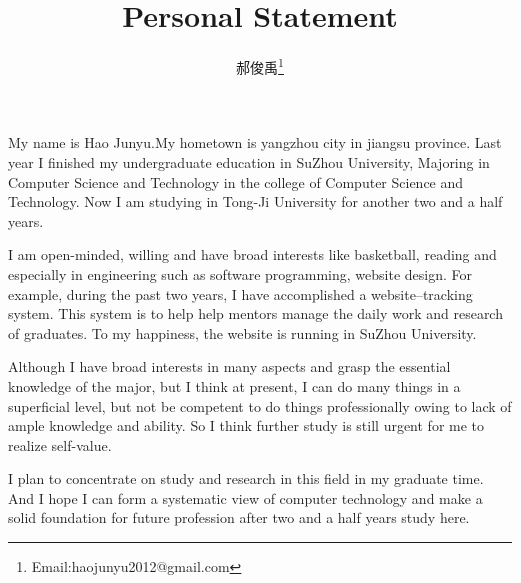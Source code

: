 \documentclass[10pt,a4paper]{article}
\begin{document}
\begin{CJK*}{UTF8}{gkai}
\pagestyle{fancy} 
\lhead{}
\rhead{}
\title{Personal Statement}					   		%
\author{郝俊禹\thanks{Email:haojunyu2012@gmail.com}}	%
\maketitle 											%
\thispagestyle{fancy}    							%
My name is Hao Junyu.My hometown is yangzhou city in jiangsu province. Last year I finished my undergraduate education in SuZhou University, Majoring in Computer Science and Technology in the college of Computer Science and Technology. Now I am studying in Tong-Ji University for another two and a half years.


I am open-minded, willing and have broad interests like basketball, reading and especially in engineering such as software programming, website design. For example, during the past two years, I have accomplished a website--tracking system. This system is to help help mentors manage the daily work and research of graduates. To my happiness, the website is running in       SuZhou University.


Although I have broad interests in many aspects and grasp the essential knowledge of the major, but I think at present, I can do many things in a superficial level, but not be competent to do things professionally owing to lack of ample knowledge and ability. So I think further study is still urgent for me to realize self-value.


I plan to concentrate on study and research in this field in my graduate time. And I hope I can form a systematic view of computer technology and make a solid foundation for future profession after two and a half years study here.













\clearpage     
\end{CJK*}
\end{document}
